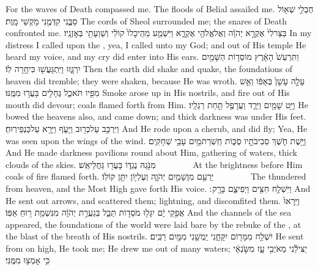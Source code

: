 {For the waves of Death compassed me. The floods of Belial assailed me.}
{חֶבְלֵ֥י שְׁא֖וֹל סַבֻּ֑נִי קִדְּמֻ֖נִי מֹ֥קְשֵׁי מָֽוֶת׃}
{The cords of Sheol surrounded me; the snares of Death confronted me.}
{בַּצַּר\maqqaf לִי֙ אֶקְרָ֣א יְהֹוָ֔ה וְאֶל\maqqaf אֱלֹהַ֖י אֶקְרָ֑א וַיִּשְׁמַ֤ע מֵהֵֽיכָלוֹ֙ קוֹלִ֔י וְשַׁוְעָתִ֖י בְּאׇזְנָֽיו׃}
{In my distress I called upon the \lord, yea, I called unto my God; and out of His temple He heard my voice, and my cry did enter into His ears.}
{ וַתִּרְעַשׁ֙ הָאָ֔רֶץ מוֹסְד֥וֹת הַשָּׁמַ֖יִם יִרְגָּ֑זוּ וַיִּֽתְגָּעֲשׁ֖וּ כִּי\maqqaf חָ֥רָה לֽוֹ׃}
{Then the earth did shake and quake, the foundations of heaven did tremble; they were shaken, because He was wroth.}
{עָלָ֤ה עָשָׁן֙ בְּאַפּ֔וֹ וְאֵ֥שׁ מִפִּ֖יו תֹּאכֵ֑ל גֶּחָלִ֖ים בָּעֲר֥וּ מִמֶּֽנּוּ׃}
{Smoke arose up in His nostrils, and fire out of His mouth did devour; coals flamed forth from Him.}
{וַיֵּ֥ט שָׁמַ֖יִם וַיֵּרַ֑ד וַעֲרָפֶ֖ל תַּ֥חַת רַגְלָֽיו׃}
{He bowed the heavens also, and came down; and thick darkness was under His feet.}
{וַיִּרְכַּ֥ב עַל\maqqaf כְּר֖וּב וַיָּעֹ֑ף וַיֵּרָ֖א עַל\maqqaf כַּנְפֵי\maqqaf רֽוּחַ׃}
{And He rode upon a cherub, and did fly; Yea, He was seen upon the wings of the wind.}
{וַיָּ֥שֶׁת חֹ֛שֶׁךְ סְבִיבֹתָ֖יו סֻכּ֑וֹת חַֽשְׁרַת\maqqaf מַ֖יִם עָבֵ֥י שְׁחָקִֽים׃}
{And He made darkness pavilions round about Him, gathering of waters, thick clouds of the skies.}
{מִנֹּ֖גַהּ נֶגְדּ֑וֹ בָּעֲר֖וּ גַּחֲלֵי\maqqaf אֵֽשׁ׃        }
{At the brightness before Him coals of fire flamed forth.}
{יַרְעֵ֥ם מִן\maqqaf שָׁמַ֖יִם יְהֹוָ֑ה וְעֶלְי֖וֹן יִתֵּ֥ן קוֹלֽוֹ׃        }
{The \lord\space thundered from heaven, and the Most High gave forth His voice.}
{וַיִּשְׁלַ֥ח חִצִּ֖ים וַיְפִיצֵ֑ם בָּרָ֖ק ׃}
{And He sent out arrows, and scattered them; lightning, and discomfited them.}
{וַיֵּֽרָאוּ֙ אֲפִ֣קֵי יָ֔ם יִגָּל֖וּ מֹסְד֣וֹת תֵּבֵ֑ל בְּגַעֲרַ֣ת יְהֹוָ֔ה מִנִּשְׁמַ֖ת ר֥וּחַ אַפּֽוֹ׃}
{And the channels of the sea appeared, the foundations of the world were laid bare by the rebuke of the \lord, at the blast of the breath of His nostrils.}
{יִשְׁלַ֥ח מִמָּר֖וֹם יִקָּחֵ֑נִי יַֽמְשֵׁ֖נִי מִמַּ֥יִם רַבִּֽים׃}
{He sent from on high, He took me; He drew me out of many waters;}
{יַצִּילֵ֕נִי מֵאֹיְבִ֖י עָ֑ז מִשֹּׂ֣נְאַ֔י כִּ֥י אָמְצ֖וּ מִמֶּֽנִּי׃}
